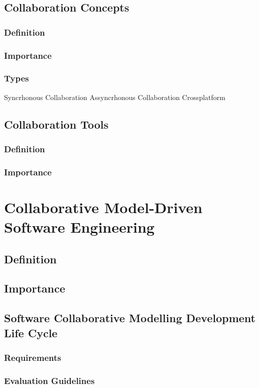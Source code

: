 \subsection{Collaboration Concepts}
\subsubsection{Definition}
\subsubsection{Importance}
\subsubsection{Types}
      Syncrhonous Collaboration
      Assyncrhonous Collaboration
      Crossplatform

\subsection{Collaboration Tools}
\subsubsection{Definition}
\subsubsection{Importance}

\section{Collaborative Model-Driven Software Engineering}
\subsection{Definition}
\subsection{Importance}
\subsection{Software Collaborative Modelling Development Life Cycle}
\subsubsection{Requirements}
\subsubsection{Evaluation Guidelines}

